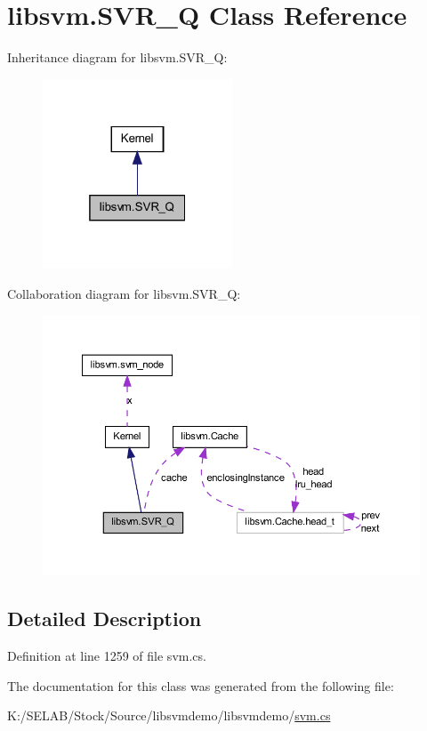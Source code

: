 \hypertarget{classlibsvm_1_1_s_v_r___q}{
\section{libsvm.SVR\_\-Q Class Reference}
\label{classlibsvm_1_1_s_v_r___q}
}


Inheritance diagram for libsvm.SVR\_\-Q:
\nopagebreak
\begin{figure}[H]
\begin{center}
\leavevmode
\includegraphics[width=160pt]{classlibsvm_1_1_s_v_r___q__inherit__graph}
\end{center}
\end{figure}


Collaboration diagram for libsvm.SVR\_\-Q:
\nopagebreak
\begin{figure}[H]
\begin{center}
\leavevmode
\includegraphics[width=379pt]{classlibsvm_1_1_s_v_r___q__coll__graph}
\end{center}
\end{figure}


\subsection{Detailed Description}


Definition at line 1259 of file svm.cs.



The documentation for this class was generated from the following file:\begin{DoxyCompactItemize}
\item 
K:/SELAB/Stock/Source/libsvmdemo/libsvmdemo/\hyperlink{svm_8cs}{svm.cs}\end{DoxyCompactItemize}
